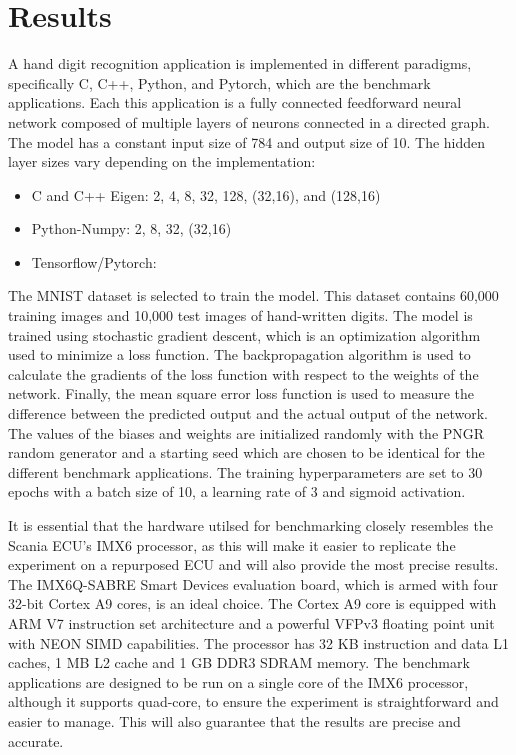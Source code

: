 \chapter{Results}
A hand digit recognition application is implemented in different paradigms, specifically C, C++, Python, and Pytorch, which are the benchmark applications. Each this application is a fully connected feedforward neural network composed of multiple layers of neurons connected in a directed graph. The model has a constant input size of 784 and output size of 10. The hidden layer sizes vary depending on the implementation:
\begin{itemize}
	\item C and C++ Eigen: 2, 4, 8, 32, 128, (32,16), and (128,16)
	\item Python-Numpy: 2, 8, 32, (32,16)
	\item Tensorflow/Pytorch:
\end{itemize}
The MNIST dataset is selected to train the model. This dataset contains 60,000 training images and 10,000 test images of hand-written digits. The model is trained using stochastic gradient descent, which is an optimization algorithm used to minimize a loss function. The backpropagation algorithm is used to calculate the gradients of the loss function with respect to the weights of the network. Finally, the mean square error loss function is used to measure the difference between the predicted output and the actual output of the network. The values of the biases and weights are initialized randomly with the PNGR random generator and a starting seed which are chosen to be identical for the different benchmark applications. The training hyperparameters are set to 30 epochs with a batch size of 10, a learning rate of 3 and sigmoid activation.

It is essential that the hardware utilsed for benchmarking closely resembles the Scania ECU's IMX6 processor, as this will make it easier to replicate the experiment on a repurposed ECU and will also provide the most precise results. The IMX6Q-SABRE Smart Devices evaluation board, which is armed with four 32-bit Cortex A9 cores, is an ideal choice. The Cortex A9 core is equipped with ARM V7 instruction set architecture and a powerful VFPv3 floating point unit with NEON SIMD capabilities. The processor has 32 KB instruction and data L1 caches, 1 MB L2 cache and 1 GB DDR3 SDRAM memory. The benchmark applications are designed to be run on a single core of the IMX6 processor, although it supports quad-core, to ensure the experiment is straightforward and easier to manage. This will also guarantee that the results are precise and accurate.

